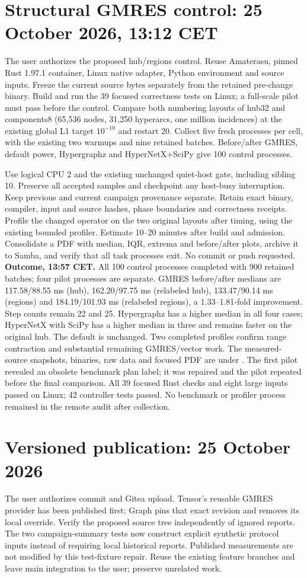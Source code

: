 \documentclass[10pt,a4paper]{article}
\begin{document}
\section*{Structural GMRES control: 25 October 2026, 13:12 CET}
The user authorizes the proposed hub/regions control. Reuse Amaterasu, pinned
Rust 1.97.1 container, Linux native adapter, Python environment and source inputs.
Freeze the current source bytes separately from the retained pre-change binary.
Build and run the 39 focused correctness tests on Linux; a full-scale pilot must
pass before the control. Compare both numbering layouts of hub32 and components8
(65,536 nodes, 31,250 hyperarcs, one million incidences) at the existing global
L1 target $10^{-10}$ and restart 20. Collect five fresh processes per cell,
with the existing two warmups and nine retained batches. Before/after GMRES,
default power, Hypergraphz and HyperNetX+SciPy give 100 control processes.

Use logical CPU 2 and the existing unchanged quiet-host gate, including sibling
10. Preserve all accepted samples and checkpoint any host-busy interruption.
Keep previous and current campaign provenance separate. Retain exact binary,
compiler, input and source hashes, phase boundaries and correctness receipts.
Profile the changed operator on the two original layouts after timing, using
the existing bounded profiler. Estimate 10--20 minutes after build and admission.
Consolidate a PDF with median, IQR, extrema and before/after plots, archive it
to Samba, and verify that all task processes exit. No commit or push requested.
\textbf{Outcome, 13:57 CET.} All 100 control processes completed with 900 retained
batches; four pilot processes are separate. GMRES before/after medians are
117.58/88.55 ms (hub), 162.20/97.75 ms (relabeled hub), 133.47/90.14 ms (regions)
and 184.19/101.93 ms (relabeled regions), a 1.33--1.81-fold improvement. Step counts
remain 22 and 25. Hypergraphz has a higher median in all four cases; HyperNetX
with SciPy has a higher median in three and remains faster on the original hub.
The default is unchanged. Two completed profiles confirm range contraction and
substantial remaining GMRES/vector work. The measured-source snapshots, binaries,
raw data and focused PDF are under
.
The first pilot revealed an obsolete benchmark plan label; it was repaired and
the pilot repeated before the final comparison. All 39 focused Rust checks and
eight large inputs passed on Linux; 42 controller tests passed. No benchmark or
profiler process remained in the remote audit after collection.
\section*{Versioned publication: 25 October 2026}
The user authorizes commit and Gitea upload. Tensor's reusable GMRES provider
has been published first; Graph pins that exact revision and removes its local
override. Verify the proposed source tree independently of ignored reports.
The two campaign-summary tests now construct explicit synthetic protocol inputs
instead of requiring local historical reports. Published measurements are not
modified by this test-fixture repair. Reuse the existing feature branches and
leave main integration to the user; preserve unrelated work.
\end{document}

